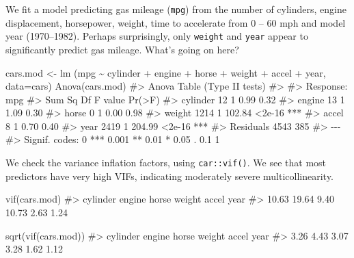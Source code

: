 \documentclass[
  letterpaper,
  10pt,
  krantz2]{krantz}
\makeatletter
\newenvironment{Shaded}{\begin{snugshade}}{\end{snugshade}}
\newcommand{\AttributeTok}[1]{\textcolor[rgb]{0.40,0.45,0.13}{#1}}
\newcommand{\CommentTok}[1]{\textcolor[rgb]{0.37,0.37,0.37}{#1}}
\newcommand{\FunctionTok}[1]{\textcolor[rgb]{0.28,0.35,0.67}{#1}}
\newcommand{\NormalTok}[1]{\textcolor[rgb]{0.00,0.23,0.31}{#1}}
\newcommand{\OtherTok}[1]{\textcolor[rgb]{0.00,0.23,0.31}{#1}}
\newcommand{\SpecialCharTok}[1]{\textcolor[rgb]{0.37,0.37,0.37}{#1}}
\newenvironment{kframe}{%
  \medskip{}
  \setlength{\fboxsep}{.8em}
  \def\at@end@of@kframe{}%
  \ifinner\ifhmode%
  \def\at@end@of@kframe{\end{minipage}}%
  \begin{minipage}{\columnwidth}%
  \fi\fi%
  \def\FrameCommand##1{\hskip\@totalleftmargin \hskip-\fboxsep
  \colorbox{shadecolor}{##1}\hskip-\fboxsep
      \hskip-\linewidth \hskip-\@totalleftmargin \hskip\columnwidth}%
  \MakeFramed {\advance\hsize-\width
    \@totalleftmargin\z@ \linewidth\hsize
    \@setminipage}}%
{\par\unskip\endMakeFramed%
  \at@end@of@kframe}
\renewenvironment{Shaded}{\begin{kframe}}{\end{kframe}}
\makeatother
\begin{document}
We fit a model predicting gas mileage (\texttt{mpg}) from the number of
cylinders, engine displacement, horsepower, weight, time to accelerate
from 0 -- 60 mph and model year (1970--1982). Perhaps surprisingly, only
\texttt{weight} and \texttt{year} appear to significantly predict gas
mileage. What's going on here?

\begin{Shaded}
\begin{Highlighting}[]
\NormalTok{cars.mod }\OtherTok{\textless{}{-}} \FunctionTok{lm}\NormalTok{ (mpg }\SpecialCharTok{\textasciitilde{}}\NormalTok{ cylinder }\SpecialCharTok{+}\NormalTok{ engine }\SpecialCharTok{+}\NormalTok{ horse }\SpecialCharTok{+}\NormalTok{ weight }\SpecialCharTok{+}\NormalTok{ accel }\SpecialCharTok{+}\NormalTok{ year, }
                \AttributeTok{data=}\NormalTok{cars)}
\FunctionTok{Anova}\NormalTok{(cars.mod)}
\CommentTok{\#\textgreater{} Anova Table (Type II tests)}
\CommentTok{\#\textgreater{} }
\CommentTok{\#\textgreater{} Response: mpg}
\CommentTok{\#\textgreater{}           Sum Sq  Df F value Pr(\textgreater{}F)    }
\CommentTok{\#\textgreater{} cylinder      12   1    0.99   0.32    }
\CommentTok{\#\textgreater{} engine        13   1    1.09   0.30    }
\CommentTok{\#\textgreater{} horse          0   1    0.00   0.98    }
\CommentTok{\#\textgreater{} weight      1214   1  102.84 \textless{}2e{-}16 ***}
\CommentTok{\#\textgreater{} accel          8   1    0.70   0.40    }
\CommentTok{\#\textgreater{} year        2419   1  204.99 \textless{}2e{-}16 ***}
\CommentTok{\#\textgreater{} Residuals   4543 385                   }
\CommentTok{\#\textgreater{} {-}{-}{-}}
\CommentTok{\#\textgreater{} Signif. codes:  0 \textquotesingle{}***\textquotesingle{} 0.001 \textquotesingle{}**\textquotesingle{} 0.01 \textquotesingle{}*\textquotesingle{} 0.05 \textquotesingle{}.\textquotesingle{} 0.1 \textquotesingle{} \textquotesingle{} 1}
\end{Highlighting}
\end{Shaded}

We check the variance inflation factors, using \texttt{car::vif()}. We
see that most predictors have very high VIFs, indicating moderately
severe multicollinearity.

\begin{Shaded}
\begin{Highlighting}[]
\FunctionTok{vif}\NormalTok{(cars.mod)}
\CommentTok{\#\textgreater{} cylinder   engine    horse   weight    accel     year }
\CommentTok{\#\textgreater{}    10.63    19.64     9.40    10.73     2.63     1.24}

\FunctionTok{sqrt}\NormalTok{(}\FunctionTok{vif}\NormalTok{(cars.mod))}
\CommentTok{\#\textgreater{} cylinder   engine    horse   weight    accel     year }
\CommentTok{\#\textgreater{}     3.26     4.43     3.07     3.28     1.62     1.12}
\end{Highlighting}
\end{Shaded}
\end{document}

